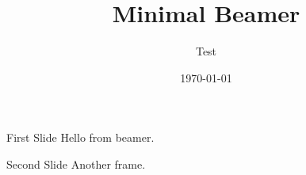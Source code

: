 \documentclass{article}
\title{Minimal Beamer}
\author{Test}
\date{\today}
\begin{document}
\begin{frame}{First Slide}
Hello from beamer.
\end{frame}

\begin{frame}{Second Slide}
Another frame.
\end{frame}
\end{document}
